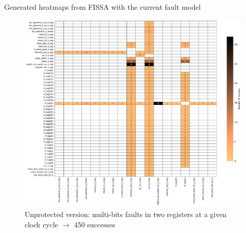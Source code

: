 \begin{frame}{Generated heatmaps from FISSA with the current fault model}
    \begin{figure}
        \centering
        \includegraphics[height=.825\textheight]{src/5_results/img/heatmap_buffer_overflow_wop_1_multi_bitflip_reg_multi_2.pdf}
        \caption{Unprotected version: multi-bits faults in two registers at a given clock cycle $\rightarrow$ 450 successes}
        \label{fig:heatmap_multibit_0}
    \end{figure}
\end{frame}

